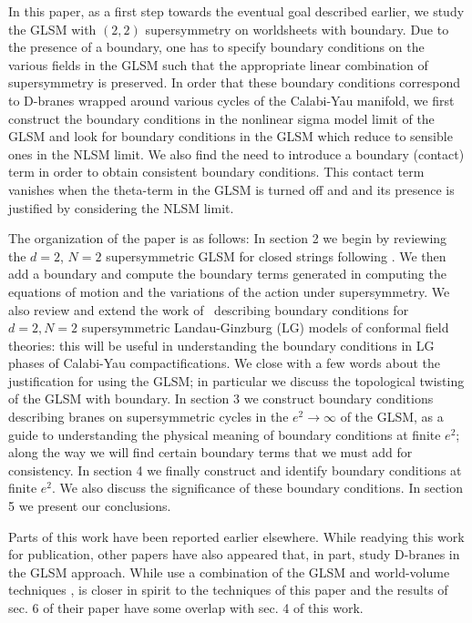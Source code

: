 \documentclass[a4paper,12pt]{article}
\begin{document}
In this paper, as a first step towards the eventual goal described
earlier, we study the GLSM with $(2,2)$ supersymmetry on worldsheets with
boundary. Due to the presence of a boundary, one has to specify boundary
conditions on the various fields in the GLSM such that the appropriate
linear combination of supersymmetry is preserved. In order that these
boundary conditions correspond to D-branes wrapped around various cycles of
the Calabi-Yau manifold, we first construct the boundary conditions in the
nonlinear sigma model limit of the GLSM and look for boundary conditions
in the GLSM which reduce to sensible ones in the NLSM limit. We also find
the need to introduce a boundary (contact) term in order to obtain
consistent boundary conditions. This contact term vanishes when the
theta-term in the GLSM is turned off and and its presence is justified by
considering the NLSM limit. 

The organization of the paper is as follows: In section 2 we begin by
reviewing the $d=2$, $N=2$ supersymmetric GLSM for closed strings
following \cite{wittenphases}. We then add a boundary and compute the
boundary terms generated in computing the equations of motion and the
variations of the action under supersymmetry.  We also review and extend
the work of \cite{stt,boundarylg}\ describing boundary conditions for
$d=2,N=2$ supersymmetric Landau-Ginzburg (LG) models of conformal field
theories: this will be useful in understanding the boundary conditions in
LG phases of Calabi-Yau compactifications. We close with a few words about
the justification for using the GLSM; in particular we discuss the
topological twisting of the GLSM with boundary. In section 3 we construct
boundary conditions describing branes on supersymmetric cycles in the $e^2
\rightarrow \infty$ of the GLSM, as a guide to understanding the physical
meaning of boundary conditions at finite $e^2$; along the way we will find
certain boundary terms that we must add for consistency.  In section 4 we
finally construct and identify boundary conditions at finite $e^2$. We
also discuss the significance of these boundary conditions. In section 5
we present our conclusions. 

Parts of this work have been reported earlier
elsewhere\cite{thesis,talks}.  While readying this work for publication,
other papers \cite{HV,HIV,doug-diac} have also appeared that, in part,
study D-branes in the GLSM approach. While \cite{doug-diac} use a
combination of the GLSM and world-volume techniques , \cite{HIV} is closer
in spirit to the techniques of this paper and the results of sec. 6 of
their paper have some overlap with sec. 4 of this work. 
\end{document}
